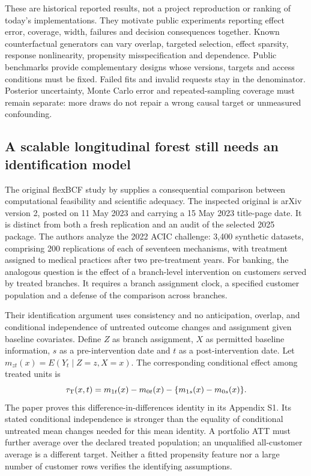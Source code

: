 These are historical reported results, not a project reproduction or ranking of today's implementations. They motivate public experiments reporting effect error, coverage, width, failures and decision consequences together. Known counterfactual generators can vary overlap, targeted selection, effect sparsity, response nonlinearity, propensity misspecification and dependence. Public benchmarks provide complementary designs whose versions, targets and access conditions must be fixed. Failed fits and invalid requests stay in the denominator. Posterior uncertainty, Monte Carlo error and repeated-sampling coverage must remain separate: more draws do not repair a wrong causal target or unmeasured confounding.~\citep{exec21_cxx_hahn,exec21_cxx_reference}

\subsection{A scalable longitudinal forest still needs an identification model}
\label{rel17:flex-paper}
The original flexBCF study by \citet{rel17flexpaper} supplies a consequential comparison between computational feasibility and scientific adequacy. The inspected original is arXiv version 2, posted on 11 May 2023 and carrying a 15 May 2023 title-page date. It is distinct from both a fresh replication and an audit of the selected 2025 package. The authors analyze the 2022 ACIC challenge: 3,400 synthetic datasets, comprising 200 replications of each of seventeen mechanisms, with treatment assigned to medical practices after two pre-treatment years. For banking, the analogous question is the effect of a branch-level intervention on customers served by treated branches. It requires a branch assignment clock, a specified customer population and a defense of the comparison across branches.~\citep{rel17flexpaper}

Their identification argument uses consistency and no anticipation, overlap, and conditional independence of untreated outcome changes and assignment given baseline covariates. Define $Z$ as branch assignment, $X$ as permitted baseline information, $s$ as a pre-intervention date and $t$ as a post-intervention date. Let $m_{zt}(x)=E(Y_t\mid Z=z,X=x)$. The corresponding conditional effect among treated units is
\begin{equation}
 \tau_{\rm T}(x,t)
 =m_{1t}(x)-m_{0t}(x)-\{m_{1s}(x)-m_{0s}(x)\}.
 \label{rel17:flex-did}
\end{equation}
The paper proves this difference-in-differences identity in its Appendix S1. Its stated conditional independence is stronger than the equality of conditional untreated mean changes needed for this mean identity. A portfolio ATT must further average over the declared treated population; an unqualified all-customer average is a different target. Neither a fitted propensity feature nor a large number of customer rows verifies the identifying assumptions.~\citep{rel17flexpaper}

